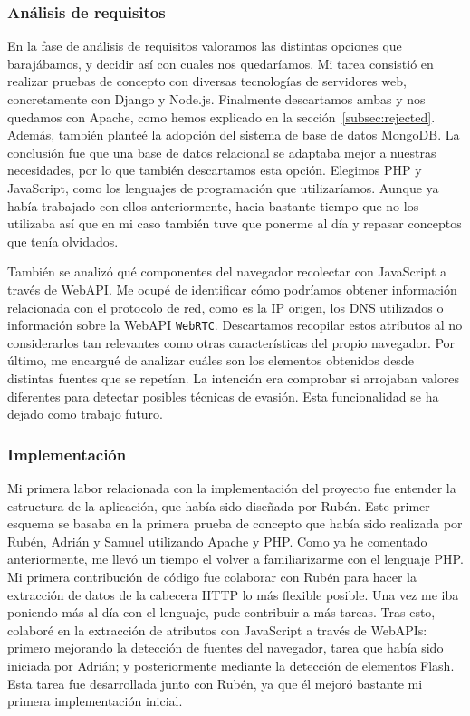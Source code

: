 \subsubsection{Análisis de requisitos}

En la fase de análisis de requisitos valoramos las distintas opciones que barajábamos, y decidir así con cuales nos quedaríamos. Mi tarea consistió en realizar pruebas de concepto con diversas tecnologías de servidores web, concretamente con Django y Node.js. Finalmente descartamos ambas y nos quedamos con Apache, como hemos explicado en la sección~\ref{subsec:rejected}. Además, también planteé la adopción del sistema de base de datos MongoDB. La conclusión fue que una base de datos relacional se adaptaba mejor a nuestras necesidades, por lo que también descartamos esta opción. Elegimos PHP y JavaScript, como los lenguajes de programación que utilizaríamos. Aunque ya había trabajado con ellos anteriormente, hacia bastante tiempo que no los utilizaba así que en mi caso también tuve que ponerme al día y repasar conceptos que tenía olvidados. \par 

También se analizó qué componentes del navegador recolectar con JavaScript a través de WebAPI. Me ocupé de identificar cómo podríamos obtener información relacionada con el protocolo de red, como es la IP origen, los DNS utilizados o información sobre la WebAPI \texttt{WebRTC}. Descartamos recopilar estos atributos al no considerarlos tan relevantes como otras características del propio navegador. Por último, me encargué de analizar cuáles son los elementos obtenidos desde distintas fuentes que se repetían. La intención era comprobar si arrojaban valores diferentes para detectar posibles técnicas de evasión. Esta funcionalidad se ha dejado como trabajo futuro. \par 

\subsubsection{Implementación}

Mi primera labor relacionada con la implementación del proyecto fue entender la estructura de la aplicación, que había sido diseñada por Rubén. Este primer esquema se basaba en la primera prueba de concepto que había sido realizada por Rubén, Adrián y Samuel utilizando Apache y PHP. Como ya he comentado anteriormente, me llevó un tiempo el volver a familiarizarme con el lenguaje PHP. Mi primera contribución de código fue colaborar con Rubén para hacer la extracción de datos de la cabecera HTTP lo más flexible posible. Una vez me iba poniendo más al día con el lenguaje, pude contribuir a más tareas. Tras esto, colaboré en la extracción de atributos con JavaScript a través de WebAPIs: primero mejorando la detección de fuentes del navegador, tarea que había sido iniciada por Adrián; y posteriormente mediante la detección de elementos Flash. Esta tarea fue desarrollada junto con Rubén, ya que él mejoró bastante mi primera implementación inicial. \par 

